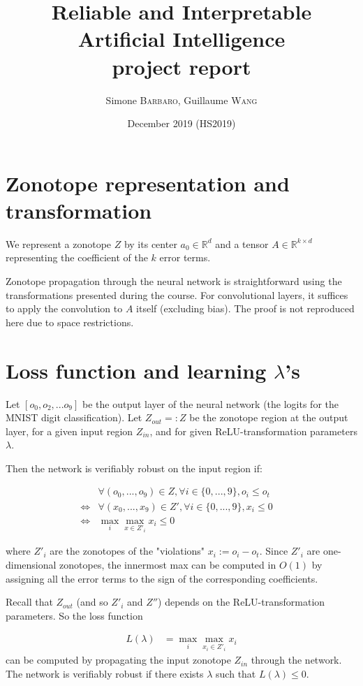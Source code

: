\documentclass{article}
\title{Reliable and Interpretable Artificial Intelligence \\ project report}
\author{Simone \textsc{Barbaro}, Guillaume \textsc{Wang}}
\date{\small{ December 2019 (HS2019)}}
\newcommand{\RR}{\mathbb{R}}
\begin{document}
\maketitle

\section{Zonotope representation and transformation}

We represent a zonotope $Z$ by its center $a_0 \in \RR^d$ and a tensor $A \in \RR^{k \times d}$ representing the coefficient of the $k$ error terms.

Zonotope propagation through the neural network is straightforward using the transformations presented during the course.
For convolutional layers, it suffices to apply the convolution to $A$ itself (excluding bias).
The proof is not reproduced here due to space restrictions.

\section{Loss function and learning \texorpdfstring{$\lambda$'s}{lambdas}}

Let $[o_0, o_2, ... o_9]$ be the output layer of the neural network (the logits for the MNIST digit classification). 
Let $Z_{out} =: Z$ be the zonotope region at the output layer, for a given input region $Z_{in}$, and for given ReLU-transformation parameters $\lambda$.

Then the network is verifiably robust on the input region if:

\begin{align*}
    &\forall (o_0, ..., o_9) \in Z, \forall i \in \{0, ..., 9\}, o_i \leq o_t \nonumber \\
    \iff & \forall (x_0, ..., x_9) \in Z', \forall i \in \{0, ..., 9\}, x_i \leq 0 \nonumber \quad \\
    \iff & \max_i \max_{x \in Z'_i} x_i \leq 0
\end{align*}

where $Z'_i$ are the zonotopes of the "violations" $x_i := o_i - o_t$.
Since $Z'_i$ are one-dimensional zonotopes, the innermost max can be computed in $O(1)$ by assigning all the error terms to the sign of the corresponding coefficients.

Recall that $Z_{out}$ (and so $Z'_i$ and $Z''$) depends on the ReLU-transformation parameters. So the loss function

\begin{align}
    L(\lambda) &= \max_i \max_{x_i \in Z'_i} x_i
\end{align}
can be computed by propagating the input zonotope $Z_{in}$ through the network.
The network is verifiably robust if there exists $\lambda$ such that $L(\lambda) \leq 0$.
\end{document}
